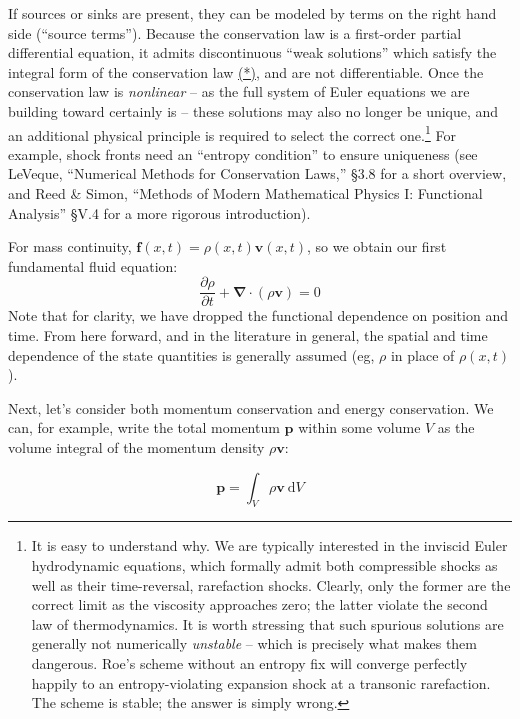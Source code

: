 \documentclass[notoc]{tufte-handout}
\renewcommand{\vec}[1]{\mathbf{#1}}
\newcommand{\del}{\vec{\nabla}}
\begin{document}
If sources or sinks are present, they can be modeled by terms on the right hand side (``source terms''). Because the conservation law is a first-order partial differential equation, it admits discontinuous ``weak solutions'' which satisfy the integral form of the conservation law \hyperlink{star}{(*)}, and are not differentiable. Once the conservation law is {\it nonlinear} -- as the full system of Euler equations we are building toward certainly is -- these solutions may also no longer be unique, and an additional physical principle is required to select the correct one.\footnote{It is easy to understand why. We are typically interested in the inviscid Euler hydrodynamic equations, which formally admit both compressible shocks as well as their time-reversal, rarefaction shocks. Clearly, only the former are the correct limit as the viscosity approaches zero; the latter violate the second law of thermodynamics. It is worth stressing that such spurious solutions are generally not numerically {\it unstable} -- which is precisely what makes them dangerous. Roe's scheme without an entropy fix will converge perfectly happily to an entropy-violating expansion shock at a transonic rarefaction. The scheme is stable; the answer is simply wrong.} For example, shock fronts need an ``entropy condition'' to ensure uniqueness (see LeVeque, ``Numerical Methods for Conservation Laws,'' \S 3.8 for a short overview, and Reed \& Simon, ``Methods of Modern Mathematical Physics I: Functional Analysis'' \S V.4 for a more rigorous introduction).

For mass continuity, $\vec{f} (x,t)=\rho (x,t) \vec{v}(x,t)$, so we obtain our first fundamental fluid equation:
\begin{equation}
\boxed {\frac{\partial \rho}{\partial t} + \del\cdot (\rho\vec{v}) = 0}
\label {eqn:continuity}
\end{equation}
%
Note that for clarity, we have dropped the functional dependence on position and time. From here forward, and in the literature in general, the spatial and time dependence of the state quantities is generally assumed (eg, $\rho$ in place of $\rho (x, t)$).

Next, let's consider both momentum conservation and energy conservation. We can, for example, write the total momentum $\vec {p}$ within some volume $V$ as the volume integral of the momentum density $\rho \vec {v}$:

\begin{equation}
\vec{p} = \int_V \rho \vec{v}~\mathrm{d}V
\end{equation}
\end{document}
